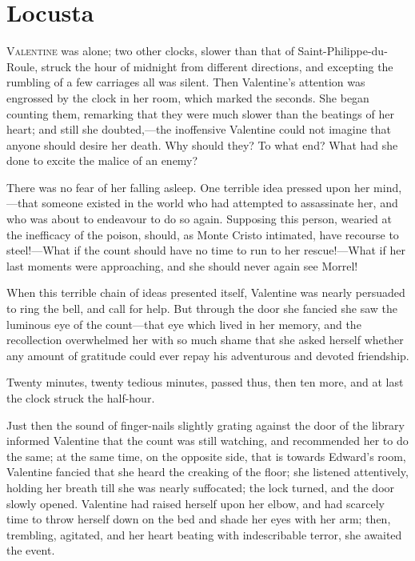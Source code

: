 \chapter{Locusta} 

 \lettrine{V}{alentine} was alone; two other clocks, slower than that of Saint-Philippe-du-Roule, struck the hour of midnight from different directions, and excepting the rumbling of a few carriages all was silent. Then Valentine's attention was engrossed by the clock in her room, which marked the seconds. She began counting them, remarking that they were much slower than the beatings of her heart; and still she doubted,—the inoffensive Valentine could not imagine that anyone should desire her death. Why should they? To what end? What had she done to excite the malice of an enemy? 

 There was no fear of her falling asleep. One terrible idea pressed upon her mind,—that someone existed in the world who had attempted to assassinate her, and who was about to endeavour to do so again. Supposing this person, wearied at the inefficacy of the poison, should, as Monte Cristo intimated, have recourse to steel!—What if the count should have no time to run to her rescue!—What if her last moments were approaching, and she should never again see Morrel! 

 When this terrible chain of ideas presented itself, Valentine was nearly persuaded to ring the bell, and call for help. But through the door she fancied she saw the luminous eye of the count—that eye which lived in her memory, and the recollection overwhelmed her with so much shame that she asked herself whether any amount of gratitude could ever repay his adventurous and devoted friendship. 

 Twenty minutes, twenty tedious minutes, passed thus, then ten more, and at last the clock struck the half-hour. 

 Just then the sound of finger-nails slightly grating against the door of the library informed Valentine that the count was still watching, and recommended her to do the same; at the same time, on the opposite side, that is towards Edward's room, Valentine fancied that she heard the creaking of the floor; she listened attentively, holding her breath till she was nearly suffocated; the lock turned, and the door slowly opened. Valentine had raised herself upon her elbow, and had scarcely time to throw herself down on the bed and shade her eyes with her arm; then, trembling, agitated, and her heart beating with indescribable terror, she awaited the event. 

